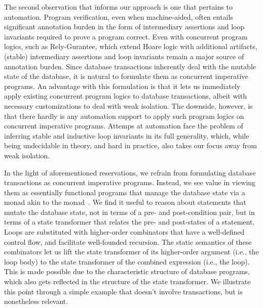  
The second observation that informs our approach is one that pertains
to automation. Program verification, even when machine-aided, often
entails significant annotation burden in the form of intermediary
assertions and loop invariants required to prove a program correct.
Even with concurrent program logics, such as Rely-Gurantee, which
extend Hoare logic with additional artifacts, (stable) intermediary
assertions and loop invariants remain a major source of annotation
burden. Since database transactions inherently deal with the mutable
state of the database, it is natural to formulate them as concurrent
imperative programs. An advantage with this formulation is that it
lets us immediately apply existing concurrent program logics to
database transactions, albeit with necessary customizations to deal
with weak isolation. The downside, however, is that there hardly is
any automation support to apply such program logics on concurrent
imperative programs. Attemps at automation face the problem of
inferring stable and inductive loop invariants in its full generality,
which, while being undecidable in theory, and hard in practice, also
takes our focus away from weak isolation.

In the light of aforementioned reservations, we refrain from
formulating database transactions as concurrent imperative programs.
Instead, we see value in viewing them as essentially functional
programs that manage the database state via a monad akin to the
 monad~\cite{statemonad}. We find it useful to reason about
statements that mutate the database state, not in terms of a pre- and
post-condition pair, but in terms of a state transformer that relates
the pre- and post-states of a statement. Loops are substituted with
higher-order combinators that have a well-defined control flow, and
facilitate well-founded recursion. The static semantics of these
combinators let us lift the state transformer of its higher-order
argument (i.e., the loop body) to the state transformer of the
combined expression (i.e., the loop). This is made possible due to the
characteristic structure of database programs, which also gets
reflected in the structure of the state transformer. We illustrate
this point through a simple example that doesn't involve transactions,
but is nonetheless relevant.

